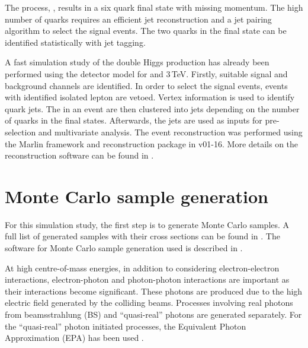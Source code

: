 The process, \eeToHHbbWWHadFull, results in a six quark final state with missing momentum. The high number of quarks requires an efficient jet reconstruction and a jet pairing algorithm to select the signal events. The two \Pbottom quarks in the final state can be identified statistically with \Pbottom jet tagging. %

A fast simulation study of the double Higgs production has already been performed using the \CLICILD detector model for  and 3\,TeV\cite{Linssen:2012hp}. Firstly, suitable signal and background channels are identified. In order to select the signal events, events with identified isolated lepton are vetoed.  Vertex information is used to identify \Pbottom quark jets. The \PFOs in an event are then clustered into jets depending on the number of quarks in the final states. Afterwards, the jets are used as inputs for pre-selection and multivariate analysis. The event reconstruction was performed using the Marlin framework and reconstruction package in \ilcsoft v01-16. More details on the reconstruction software can be found in .







\section{Monte Carlo sample generation}


For this simulation study, the first step is to generate Monte Carlo samples. A full list of generated samples with their cross sections can be found in . The software for Monte Carlo sample generation used  is described in .

At high centre-of-mass energies, in addition to considering electron-electron interactions, electron-photon and photon-photon interactions are important as their interactions become significant. These photons are produced due to the high electric field generated by the colliding beams. Processes involving real photons from beamsstrahlung (BS) and ``quasi-real'' photons are generated separately. For the ``quasi-real'' photon initiated processes, the Equivalent Photon Approximation (EPA) has been used \cite{lyth:jpa00215525}.


